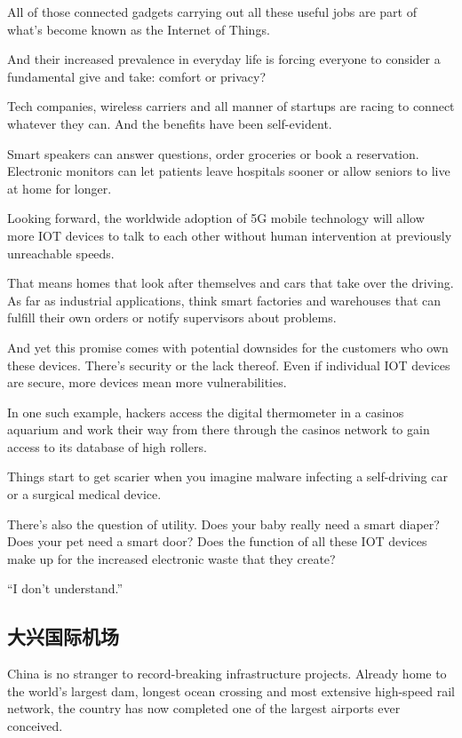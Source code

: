All of those connected gadgets carrying out all these useful jobs are part of what's become known as the Internet of Things.

And their increased prevalence in everyday life is forcing everyone to consider a fundamental give and take: comfort or privacy?

Tech companies, wireless carriers and all manner of startups are racing to connect whatever they can. And the benefits have been self-evident.

Smart speakers can answer questions, order groceries or book a reservation. Electronic monitors can let patients leave hospitals sooner or allow seniors to live at home for longer.

Looking forward, the worldwide adoption of 5G mobile technology will allow more IOT devices to talk to each other without human intervention at previously unreachable speeds.

That means homes that look after themselves and cars that take over the driving. As far as industrial applications, think smart factories and warehouses that can fulfill their own orders or notify supervisors about problems.

And yet this promise comes with potential downsides for the customers who own these devices. There's security or the lack thereof. Even if individual IOT devices are secure, more devices mean more vulnerabilities.

In one such example, hackers access the digital thermometer in a casinos aquarium and work their way from there through the casinos network to gain access to its database of high rollers.

Things start to get scarier when you imagine malware infecting a self-driving car or a surgical medical device.

There's also the question of utility. Does your baby really need a smart diaper? Does your pet need a smart door? Does the function of all these IOT devices make up for the increased electronic waste that they create?

“I don't understand.”
\subsection{大兴国际机场}
China is no stranger to record-breaking infrastructure projects. Already home to the world's largest dam, longest ocean crossing and most extensive high-speed rail network, the country has now completed one of the largest airports ever conceived.


